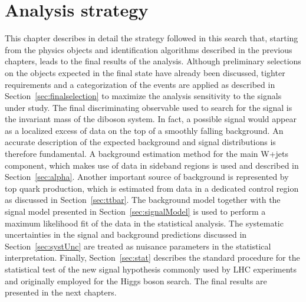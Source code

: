 \chapter{Analysis strategy}\label{ch:strategy}

This chapter describes in detail the strategy followed in this search that, starting from the physics objects and identification algorithms described in the previous chapters, leads to the final results of the analysis.
Although preliminary selections on the objects expected in the final state have already been discussed, tighter requirements and a categorization of the events are applied as described in Section~\ref{sec:finalselection} to maximize the analysis sensitivity to the signals under study. The final discriminating observable used to search for the signal is the invariant mass of the diboson system. In fact, a possible signal would appear as a localized excess of data on the top of a smoothly falling background. An accurate description of the expected background and signal distributions is therefore fundamental. A background estimation method for the main W+jets component, which makes use of data in sideband regions is used and described in Section~\ref{sec:alpha}. Another important source of background is represented by top quark production, which is estimated from data in a dedicated control region as discussed in Section~\ref{sec:ttbar}. The background model together with the signal model presented in Section~\ref{sec:signalModel} is used to perform a maximum likelihood fit of the data in the statistical analysis.
The systematic uncertainties in the signal and background predictions discussed in Section~\ref{sec:systUnc} are treated as nuisance parameters in the statistical interpretation.
Finally, Section~\ref{sec:stat} describes the standard procedure for the statistical test of the new signal hypothesis commonly used by LHC experiments and originally employed for the Higgs boson search.
The final results are presented in the next chapters.

 
  
 
 
